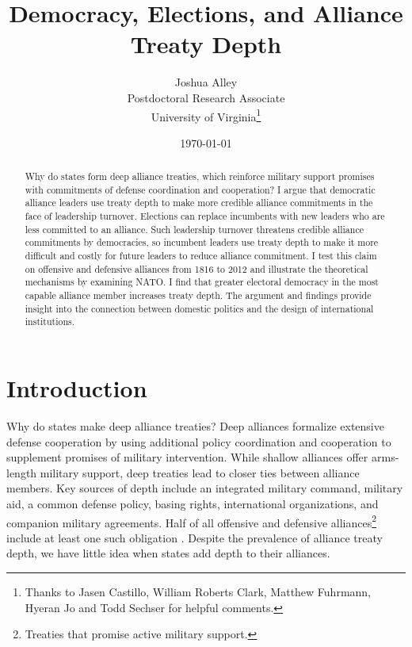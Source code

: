 \documentclass[12pt]{article}
\title{\textbf{Democracy, Elections, and Alliance Treaty Depth}}
\author{Joshua Alley \\
Postdoctoral Research Associate \\
University of Virginia\thanks{Thanks to Jasen Castillo, William Roberts Clark, Matthew Fuhrmann, Hyeran Jo and Todd Sechser for helpful comments.}}
\date{\today}
\begin{document}
\maketitle 

\doublespace 

\begin{abstract}
Why do states form deep alliance treaties, which reinforce military support promises with commitments of defense coordination and cooperation? 
I argue that democratic alliance leaders use treaty depth to make more credible alliance commitments in the face of leadership turnover. 
Elections can replace incumbents with new leaders who are less committed to an alliance. 
Such leadership turnover threatens credible alliance commitments by democracies, so incumbent leaders use treaty depth to make it more difficult and costly for future leaders to reduce alliance commitment. 
I test this claim on offensive and defensive alliances from 1816 to 2012 and illustrate the theoretical mechanisms by examining NATO.
I find that greater electoral democracy in the most capable alliance member increases treaty depth. 
The argument and findings provide insight into the connection between domestic politics and the design of international institutions. 
\end{abstract}


\newpage 


\section{Introduction}


Why do states make deep alliance treaties? 
Deep alliances formalize extensive defense cooperation by using additional policy coordination and cooperation to supplement promises of military intervention. 
While shallow alliances offer arms-length military support, deep treaties lead to closer ties between alliance members. 
Key sources of depth include an integrated military command, military aid, a common defense policy, basing rights, international organizations, and companion military agreements.
Half of all offensive and defensive alliances\footnote{Treaties that promise active military support.} include at least one such obligation \citep{Leedsetal2002}. 
Despite the prevalence of alliance treaty depth, we have little idea when states add depth to their alliances. 
\end{document}
